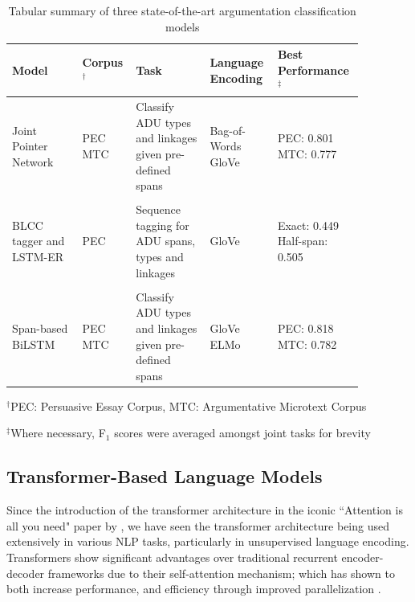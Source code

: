 \begin{table}[t]
	\centering
	\small
	\setlength{\tabcolsep}{0.5em}
	\def\arraystretch{1.1}
	\begin{threeparttable}
		\begin{tabular}{L{0.19\linewidth} L{0.10\linewidth} L{0.20\linewidth} L{0.17\linewidth} L{0.21\linewidth}}
			\toprule[0.25mm]
			Model & Corpus$^{\dagger}$ & Task & Language \qquad Encoding & Best Performance \qquad [Macro-F$_1$]$^{\ddagger}$ \\
			\midrule[0.35mm]
			Joint Pointer \qquad Network \citep{potash2016heres} & PEC \qquad MTC & Classify ADU types and linkages given pre-defined spans & Bag-of-Words \qquad GloVe & PEC: 0.801 \qquad \qquad MTC: 0.777 \\\\[-5pt]
			BLCC tagger and LSTM-ER \citep{eger2017neural} & PEC & Sequence tagging for ADU spans, types and linkages & GloVe & Exact: 0.449  \qquad Half-span: 0.505 \\\\[-5pt]
			Span-based \qquad BiLSTM \citep{kuribayashi2019empirical} & PEC \qquad MTC & Classify ADU types and linkages given pre-defined spans & GloVe \qquad ELMo & PEC: 0.818 \qquad \qquad MTC: 0.782 \\[20pt]
			\bottomrule[0.25mm]
		\end{tabular}
    \begin{tablenotes}[flushleft]
      \scriptsize
      \item $^{\dagger}$PEC: Persuasive Essay Corpus, MTC: Argumentative Microtext Corpus
      \item $^{\ddagger}$Where necessary, F$_1$ scores were averaged amongst joint tasks for brevity
    \end{tablenotes}
		\caption{Tabular summary of three state-of-the-art argumentation classification models}
		\label{table_arg_models}
	\end{threeparttable}
\end{table}

\subsection{Transformer-Based Language Models}

Since the introduction of the transformer architecture in the iconic ``Attention is all you need" paper by \citet{vaswani2017attention}, we have seen the transformer architecture being used extensively in various NLP tasks, particularly in unsupervised language encoding. Transformers show significant advantages over traditional recurrent encoder-decoder frameworks due to their self-attention mechanism; which has shown to both increase performance, and efficiency through improved parallelization \citep{vaswani2017attention}.

